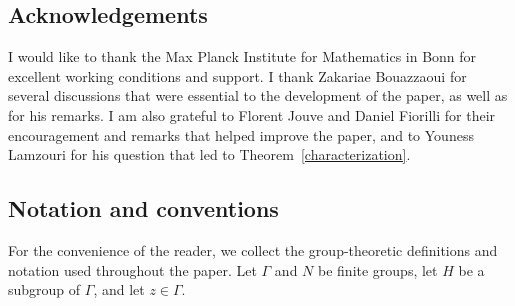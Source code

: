 \documentclass[12pt]{amsart}
\numberwithin{equation}{section}
\theoremstyle{definition}
\theoremstyle{remark}
\begin{document}
\subsection*{Acknowledgements} I would like to thank the Max Planck Institute for Mathematics in Bonn for excellent working conditions and support. I thank Zakariae Bouazzaoui for several discussions that were essential to the development of the paper, as well as for his remarks. I am also grateful to Florent Jouve and Daniel Fiorilli for their encouragement and remarks that helped improve the paper, and to Youness Lamzouri for his question that led to Theorem~\ref{characterization}.

\subsection*{Notation and conventions}
For the convenience of the reader, we collect the group-theoretic definitions and notation used throughout the paper. Let $\Gamma$ and $N$ be finite groups, let $H$ be a subgroup of $\Gamma$, and let $z \in \Gamma$. 
\end{document}
